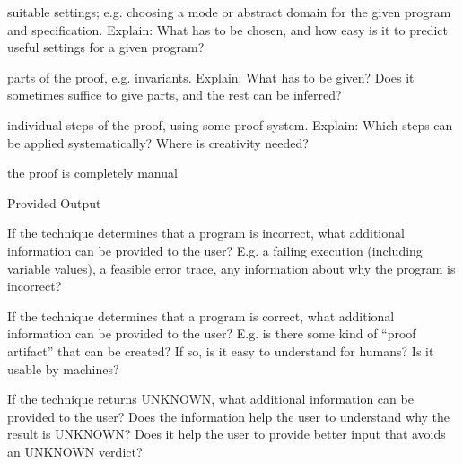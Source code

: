 \documentclass[a4paper]{article}
\begin{document}
\begin{minipage}[t]{0.16\linewidth}
\begin{betterlist}
\begin{betterlist}
			\item \checkboxUnchecked suitable settings; e.g. choosing a mode or abstract domain for the given program and specification. Explain: What has to be chosen, and how easy is it to predict useful settings for a given program?

			\item \checkboxUnchecked parts of the proof, e.g. invariants. Explain: What has to be given? Does it sometimes suffice to give parts, and the rest can be inferred?
			\item \checkboxUnchecked individual steps of the proof, using some proof system. Explain: Which steps can be applied systematically? Where is creativity needed?
			\item \checkboxUnchecked the proof is completely manual
		\end{betterlist}
		\item \alert{Provided Output}
		\begin{betterlist}
			\item If the technique determines that a program is incorrect, what additional information can be provided to the user? E.g. a failing execution (including variable values), a feasible error trace, any information about why the program is incorrect?

			\item If the technique determines that a program is correct, what additional information can be provided to the user? E.g. is there some kind of \enquote{proof artifact} that can be created? If so, is it easy to understand for humans? Is it usable by machines?

			\item If the technique returns UNKNOWN, what additional information can be provided to the user? Does the information help the user to understand why the result is UNKNOWN? Does it help the user to provide better input that avoids an UNKNOWN verdict?


\end{betterlist}
\end{betterlist}
\end{minipage}
\end{document}
